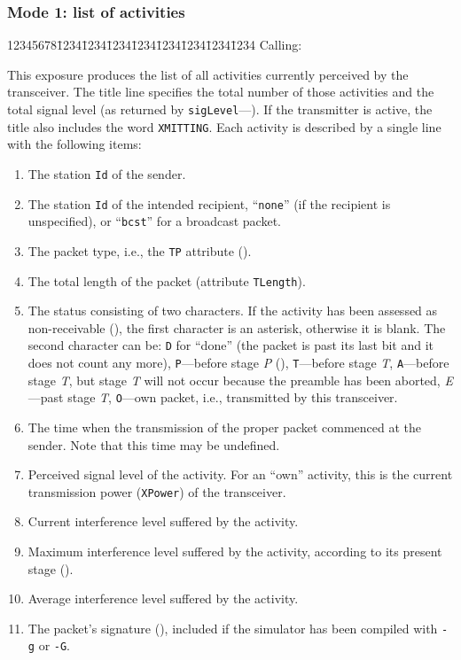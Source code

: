 \subsubsection*{Mode 1: list of activities}

{\tt\begin{tabbing}
12345678\=1234\=1234\=1234\=1234\=1234\=1234\=1234\=1234\kill
{\rm Calling:}
\end{tabbing}}

This exposure produces the list of all activities currently perceived by the
transceiver.
The title line specifies the total number of those activities and the total
signal level (as returned by {\tt sigLevel}---).
If the transmitter is active, the title also includes the word
{\tt XMITTING}.
Each activity is described by a single line with the following items:

\begin{enumerate}
\item
The station {\tt Id} of the sender.
\item
The station {\tt Id} of the intended recipient, ``{\tt none}'' (if the recipient
is unspecified), or ``{\tt bcst}'' for a broadcast packet.
\item
The packet type, i.e., the {\tt TP} attribute ().
\item
The total length of the packet (attribute {\tt TLength}).
\item
The status consisting of two characters.
If the activity has been assessed as non-receivable (),
the first character is an asterisk, otherwise it is blank.
The second character can be: {\tt D} for ``done'' (the packet is past its last
bit and it does not count any more), {\tt P}---before stage {\em P\/}
(),
{\tt T}---before stage {\em T}, {\tt A}---before stage {\em T}, but stage
{\em T\/} will not occur because the preamble has been aborted,
{\em E\/}---past stage {\em T}, {\tt O}---own packet, i.e., transmitted by
this transceiver.
\item
The time when the transmission of the proper packet commenced at the sender.
Note that this time may be undefined.
\item
Perceived signal level of the activity.
For an ``own'' activity, this is the current transmission power ({\tt XPower})
of the transceiver.
\item
Current interference level suffered by the activity.
\item
Maximum interference level suffered by the activity, according to its present
stage ().
\item
Average interference level suffered by the activity.
\item
The packet's signature (), included if the simulator
has been compiled with {\tt -g} or {\tt -G}.
\end{enumerate}

